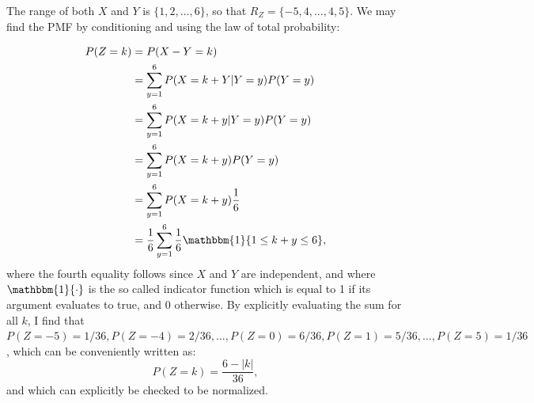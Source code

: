 \begin{problem}{3} The range of both $X$ and $Y$ is $\{1,2, \ldots, 6 \}$, so that $R_Z = \{-5,4, \ldots, 4, 5 \}$.  We may find the PMF by conditioning and using the law of total probability:

\begin{align*}
P(Z=k)&=P(X-Y=k) \\
&=\sum_{y=1}^6P(X=k+Y|Y=y)P(Y=y) \\
&=\sum_{y=1}^6P(X=k+y|Y=y)P(Y=y) \\
&=\sum_{y=1}^6P(X=k+y)P(Y=y) \\
&=\sum_{y=1}^6P(X=k+y)\frac{1}{6} \\
&=\frac{1}{6}\sum_{y=1}^6\frac{1}{6}\mathbbm{1}\{ 1 \le k+y\le 6 \},
\end{align*}
where the fourth equality follows since $X$ and $Y$ are independent, and where $\mathbbm{1}\{\cdot \}$ is the so called indicator function which is equal to 1 if its argument evaluates to true, and 0 otherwise.  By explicitly evaluating the sum for all $k$, I find that $P(Z=-5)=1/36, P(Z=-4)=2/36, \ldots, P(Z=0)=6/36, P(Z=1)=5/36, \ldots ,P(Z=5)=1/36$, which can be conveniently written as:
\begin{equation}
P(Z=k) = \frac{6-|k|}{36},
\end{equation}
and which can explicitly be checked to be normalized.


\end{problem}


